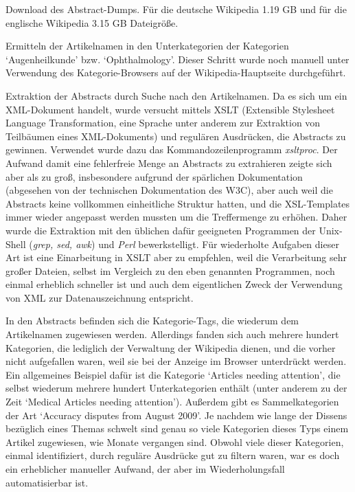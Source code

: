 \documentclass[pagesize,DIV=calc,12pt,draft]{scrreprt}
\begin{document}
\begin{inparaenum}
\item Download des Abstract-Dumps. Für die deutsche Wikipedia 1.19 GB und für die englische Wikipedia 3.15 GB Dateigröße.

\item Ermitteln der Artikelnamen in den Unterkategorien der Kategorien `Augenheilkunde' bzw. `Ophthalmology'. 
Dieser Schritt wurde noch manuell unter Verwendung des Kategorie-Browsers auf der Wikipedia-Hauptseite durchgeführt. 

\item Extraktion der Abstracts durch Suche nach den Artikelnamen. 
Da es sich um ein XML-Dokument handelt, wurde versucht mittels XSLT (Extensible Stylesheet Language Transformation, eine Sprache unter anderem zur Extraktion von Teilbäumen eines XML-Dokuments) und regulären Ausdrücken, die Abstracts zu gewinnen. 
Verwendet wurde dazu das Kommandozeilenprogramm \emph{xsltproc}. 
Der Aufwand damit eine fehlerfreie Menge an Abstracts zu extrahieren zeigte sich aber als zu groß, insbesondere aufgrund der spärlichen Dokumentation (abgesehen von der technischen Dokumentation des W3C), aber auch weil die Abstracts keine vollkommen einheitliche Struktur hatten, und die XSL-Templates immer wieder angepasst werden mussten um die Treffermenge zu erhöhen. 
Daher wurde die Extraktion mit den üblichen dafür geeigneten Programmen der Unix-Shell (\emph{grep, sed, awk}) und \emph{Perl} bewerkstelligt. 
Für wiederholte Aufgaben dieser Art ist eine Einarbeitung in XSLT aber zu empfehlen, weil die Verarbeitung sehr großer Dateien, selbst im Vergleich zu den eben genannten Programmen, noch einmal erheblich schneller ist und auch dem eigentlichen Zweck der Verwendung von XML zur Datenauszeichnung entspricht. 

\item In den Abstracts befinden sich die Kategorie-Tags, die wiederum dem Artikelnamen zugewiesen werden. 
Allerdings fanden sich auch mehrere hundert Kategorien, die lediglich der Verwaltung der Wikipedia dienen, und die vorher nicht aufgefallen waren, weil sie bei der Anzeige im Browser unterdrückt werden. 
Ein allgemeines Beispiel dafür ist die Kategorie `Articles needing attention', die selbst wiederum mehrere hundert Unterkategorien enthält (unter anderem zu der Zeit `Medical Articles needing attention'). 
Außerdem gibt es Sammelkategorien der Art `Accuracy disputes from August 2009'. 
Je nachdem wie lange der Dissens bezüglich eines Themas schwelt sind genau so viele Kategorien dieses Typs einem Artikel zugewiesen, wie Monate vergangen sind. 
Obwohl viele dieser Kategorien, einmal identifiziert, durch reguläre Ausdrücke gut zu filtern waren, war es doch ein erheblicher manueller Aufwand, der aber im Wiederholungsfall automatisierbar ist. \end{inparaenum}
\end{document}
